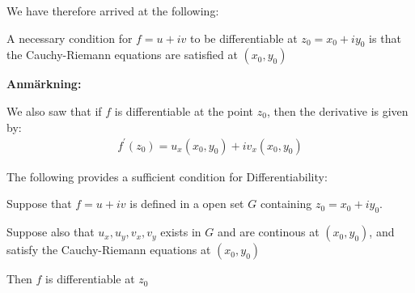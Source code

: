 \par\bigskip
\noindent We have therefore arrived at the following:
\par\bigskip
\begin{theo}[]{}
  A necessary condition for $f = u+iv$ to be differentiable at $z_0 = x_0+iy_0$ is that the Cauchy-Riemann equations are satisfied at $(x_0,y_0)$
\end{theo}
\par\bigskip
\noindent\textbf{Anmärkning:}\par
\noindent We also saw that if $f$ is differentiable at the point $z_0$, then the derivative is given by:
\begin{equation*}
  \begin{gathered}
    f^{\prime}(z_0) = u_x(x_0,y_0)+iv_x(x_0,y_0)
  \end{gathered}
\end{equation*}
\par\bigskip
\noindent The following provides a sufficient condition for Differentiability:
\par\bigskip
\begin{theo}[]{}
  Suppose that $f = u+iv$ is defined in a open set $G$ containing $z_0 = x_0+iy_0$.\par
  \noindent Suppose also that $u_x,u_y,v_x,v_y$ exists in $G$ and are continous at $(x_0,y_0)$, and satisfy the Cauchy-Riemann equations at $(x_0,y_0)$
  \par\bigskip
  \noindent Then $f$ is differentiable at $z_0$
\end{theo}
